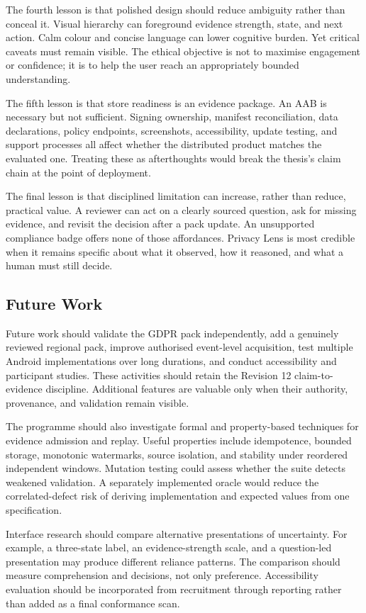 The fourth lesson is that polished design should reduce ambiguity rather than conceal it. Visual hierarchy can foreground evidence strength, state, and next action. Calm colour and concise language can lower cognitive burden. Yet critical caveats must remain visible. The ethical objective is not to maximise engagement or confidence; it is to help the user reach an appropriately bounded understanding.

The fifth lesson is that store readiness is an evidence package. An AAB is necessary but not sufficient. Signing ownership, manifest reconciliation, data declarations, policy endpoints, screenshots, accessibility, update testing, and support processes all affect whether the distributed product matches the evaluated one. Treating these as afterthoughts would break the thesis's claim chain at the point of deployment.

The final lesson is that disciplined limitation can increase, rather than reduce, practical value. A reviewer can act on a clearly sourced question, ask for missing evidence, and revisit the decision after a pack update. An unsupported compliance badge offers none of those affordances. Privacy Lens is most credible when it remains specific about what it observed, how it reasoned, and what a human must still decide.

\subsection{Future Work}

Future work should validate the GDPR pack independently, add a genuinely reviewed regional pack, improve authorised event-level acquisition, test multiple Android implementations over long durations, and conduct accessibility and participant studies. These activities should retain the Revision 12 claim-to-evidence discipline. Additional features are valuable only when their authority, provenance, and validation remain visible.

The programme should also investigate formal and property-based techniques for evidence admission and replay. Useful properties include idempotence, bounded storage, monotonic watermarks, source isolation, and stability under reordered independent windows. Mutation testing could assess whether the suite detects weakened validation. A separately implemented oracle would reduce the correlated-defect risk of deriving implementation and expected values from one specification.

Interface research should compare alternative presentations of uncertainty. For example, a three-state label, an evidence-strength scale, and a question-led presentation may produce different reliance patterns. The comparison should measure comprehension and decisions, not only preference. Accessibility evaluation should be incorporated from recruitment through reporting rather than added as a final conformance scan.

